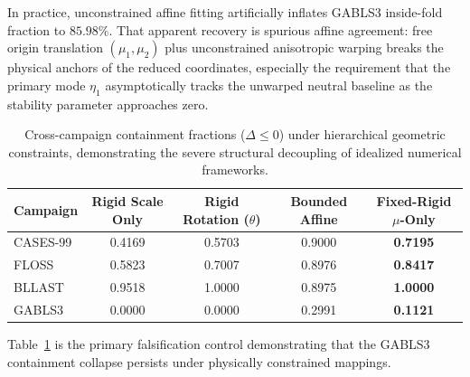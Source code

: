 \documentclass[12pt,a4paper]{article}
\begin{document}
In practice, unconstrained affine fitting artificially inflates GABLS3 inside-fold fraction to $85.98\%$. That apparent recovery is spurious affine agreement: free origin translation $(\mu_1,\mu_2)$ plus unconstrained anisotropic warping breaks the physical anchors of the reduced coordinates, especially the requirement that the primary mode $\eta_1$ asymptotically tracks the unwarped neutral baseline as the stability parameter approaches zero.

\begin{table}[htbp]
\centering
\small
\setlength{\tabcolsep}{5pt}
\renewcommand{\arraystretch}{1.1}
\begin{tabularx}{\textwidth}{@{}X c c c c@{}}
\toprule
\textbf{Campaign} & \textbf{Rigid Scale Only} & \textbf{Rigid Rotation ($\theta$)} & \textbf{Bounded Affine} & \textbf{Fixed-Rigid $\mu$-Only} \\
\midrule
CASES-99 & 0.4169 & 0.5703 & 0.9000 & \textbf{0.7195} \\
FLOSS    & 0.5823 & 0.7007 & 0.8976 & \textbf{0.8417} \\
BLLAST   & 0.9518 & 1.0000 & 0.8975 & \textbf{1.0000} \\
GABLS3   & 0.0000 & 0.0000 & 0.2991 & \textbf{0.1121} \\
\bottomrule
\end{tabularx}
\caption{Cross-campaign containment fractions ($\Delta \le 0$) under hierarchical geometric constraints, demonstrating the severe structural decoupling of idealized numerical frameworks.}
\label{tab:affine_audit}
\end{table}
Table~\ref{tab:affine_audit} is the primary falsification control demonstrating that the GABLS3 containment collapse persists under physically constrained mappings.
\end{document}
